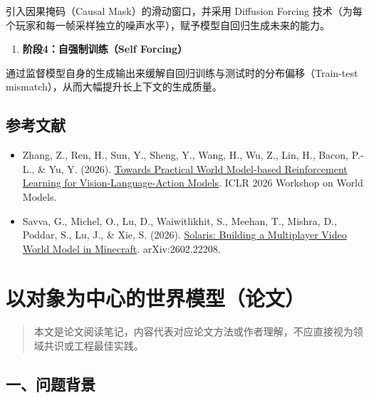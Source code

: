引入因果掩码（Causal Mask）的滑动窗口，并采用 Diffusion Forcing 技术（为每个玩家和每一帧采样独立的噪声水平），赋予模型自回归生成未来的能力。

\begin{enumerate}
\def\labelenumi{\arabic{enumi}.}
\setcounter{enumi}{3}
\tightlist
\item
  \textbf{阶段4：自强制训练（Self Forcing）}
\end{enumerate}

通过监督模型自身的生成输出来缓解自回归训练与测试时的分布偏移（Train-test mismatch），从而大幅提升长上下文的生成质量。

\hypertarget{ux53c2ux8003ux6587ux732e-184}{%
\subsection{参考文献}\label{ux53c2ux8003ux6587ux732e-184}}

\begin{itemize}
\tightlist
\item
  Zhang, Z., Ren, H., Sun, Y., Sheng, Y., Wang, H., Wu, Z., Lin, H., Bacon, P.-L., \& Yu, Y. (2026). \href{https://openreview.net/forum?id=gB1yFEd106}{Towards Practical World Model-based Reinforcement Learning for Vision-Language-Action Models}. ICLR 2026 Workshop on World Models.
\item
  Savva, G., Michel, O., Lu, D., Waiwitlikhit, S., Meehan, T., Mishra, D., Poddar, S., Lu, J., \& Xie, S. (2026). \href{https://arxiv.org/abs/2602.22208}{Solaris: Building a Multiplayer Video World Model in Minecraft}. arXiv:2602.22208.
\end{itemize}

\clearpage

\hypertarget{ux4ee5ux5bf9ux8c61ux4e3aux4e2dux5fc3ux7684ux4e16ux754cux6a21ux578bux8bbaux6587}{%
\section{以对象为中心的世界模型（论文）}\label{ux4ee5ux5bf9ux8c61ux4e3aux4e2dux5fc3ux7684ux4e16ux754cux6a21ux578bux8bbaux6587}}

\begin{quote}
本文是论文阅读笔记，内容代表对应论文方法或作者理解，不应直接视为领域共识或工程最佳实践。
\end{quote}

\hypertarget{ux4e00ux95eeux9898ux80ccux666f-10}{%
\subsection{一、问题背景}\label{ux4e00ux95eeux9898ux80ccux666f-10}}

